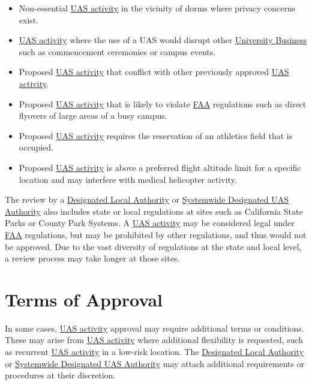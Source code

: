 \documentclass[
]{book}
\providecommand{\tightlist}{%
  \setlength{\itemsep}{0pt}\setlength{\parskip}{0pt}}
\begin{document}
\begin{itemize}
\tightlist
\item
  Non-essential \protect\hyperlink{UASactivity}{UAS activity} in the vicinity of dorms where privacy concerns exist.
\item
  \protect\hyperlink{UASactivity}{UAS activity} where the use of a UAS would disrupt other \protect\hyperlink{UB}{University Business} such as commencement ceremonies or campus events.
\item
  Proposed \protect\hyperlink{UASactivity}{UAS activity} that conflict with other previously approved \protect\hyperlink{UASactivity}{UAS activity}.
\item
  Proposed \protect\hyperlink{UASactivity}{UAS activity} that is likely to violate \protect\hyperlink{FAA}{FAA} regulations such as direct flyovers of large areas of a busy campus.
\item
  Proposed \protect\hyperlink{UASactivity}{UAS activity} requires the reservation of an athletics field that is occupied.
\item
  Proposed \protect\hyperlink{UASactivity}{UAS activity} is above a preferred flight altitude limit for a specific location and may interfere with medical helicopter activity.
\end{itemize}

The review by a \protect\hyperlink{DLA}{Designated Local Authority} or \protect\hyperlink{SDA}{Systemwide Designated UAS Authority} also includes state or local regulations at sites such as California State Parks or County Park Systems. A \protect\hyperlink{UASactivity}{UAS activity} may be considered legal under \protect\hyperlink{FAA}{FAA} regulations, but may be prohibited by other regulations, and thus would not be approved. Due to the vast diversity of regulations at the state and local level, a review process may take longer at those sites.

\hypertarget{s-term-approval}{%
\section{Terms of Approval}\label{s-term-approval}}

In some cases, \protect\hyperlink{UASactivity}{UAS activity} approval may require additional terms or conditions. These may arise from \protect\hyperlink{UASactivity}{UAS activity} where additional flexibility is requested, such as recurrent \protect\hyperlink{UASactivity}{UAS activity} in a low-risk location. The \protect\hyperlink{DLA}{Designated Local Authority} or \protect\hyperlink{SDA}{Systemwide Designated UAS Authority} may attach additional requirements or procedures at their discretion.
\end{document}
